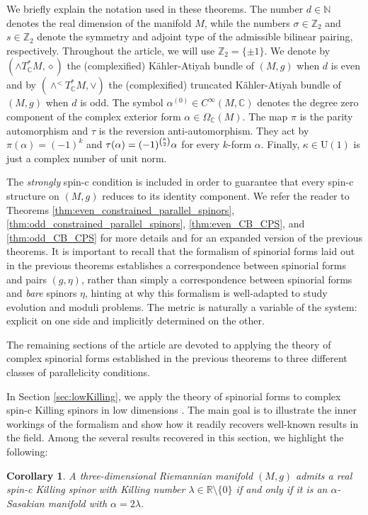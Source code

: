 \documentclass[10pt,a4paper,twoside,reqno]{amsart}
\theoremstyle{plain}
\newtheorem{cor}[thm]{Corollary}
\theoremstyle{definition}
\theoremstyle{remark}
\def\N{\mathbb{N}}
\def\Z{\mathbb{Z}}
\def\C{\mathbb{C}}
\def\R{\mathbb{R}}
\def\U{\mathrm{U}}
\def\R{\mathbb{R}}
\begin{document}
We briefly explain the notation used in these theorems. The number $d\in\N$ denotes the real dimension of the manifold $M$, while the numbers $\sigma\in\Z_2$ and $s\in\Z_2$ denote the symmetry and adjoint type of the admissible bilinear pairing, respectively. Throughout the article, we will use $\Z_2=\{\pm1\}$. We denote by $(\wedge T^*_\C M,\diamond)$ the (complexified) Kähler-Atiyah bundle of $(M,g)$ when $d$ is even and by $(\wedge^<T^*_\C M,\vee)$ the (complexified) truncated Kähler-Atiyah bundle of $(M,g)$ when $d$ is odd. The symbol $\alpha^{(0)}\in C^{\infty}(M,\C)$ denotes the degree zero component of the complex exterior form $\alpha\in\Omega_\C(M)$. The map $\pi$ is the parity automorphism and $\tau$ is the reversion anti-automorphism. They act by $\pi(\alpha)=(-1)^k$ and $\tau(\alpha)=\smash{(-1)^{\binom{k}{2}}}\alpha$ for every $k$-form $\alpha$. Finally, $\kappa\in\U(1)$ is just a complex number of unit norm.\medskip

The \emph{strongly} spin-c condition is included in order to guarantee that every spin-c structure on $(M,g)$ reduces to its identity component. We refer the reader to Theorems \ref{thm:even_constrained_parallel_spinors}, \ref{thm:odd_constrained_parallel_spinors}, \ref{thm:even_CB_CPS}, and \ref{thm:odd_CB_CPS} for more details and for an expanded version of the previous theorems. It is important to recall that the formalism of spinorial forms laid out in the previous theorems establishes a correspondence between spinorial forms and pairs $(g,\eta)$, rather than simply a correspondence between spinorial forms and \emph{bare} spinors $\eta$, hinting at why this formalism is well-adapted to study evolution and moduli problems. The metric is naturally a variable of the system: explicit on one side and implicitly determined on the other.\medskip

The remaining sections of the article are devoted to applying the theory of complex spinorial forms established in the previous theorems to three different classes of parallelicity conditions.\medskip

In Section \ref{sec:lowKilling}, we apply the theory of spinorial forms to complex spin-c Killing spinors in low dimensions \cite{Moroianu1997}. The main goal is to illustrate the inner workings of the formalism and show how it readily recovers well-known results in the field. Among the several results recovered in this section, we highlight the following:

\begin{cor}
A three-dimensional Riemannian manifold $(M,g)$ admits a real spin-c Killing spinor with Killing number $\lambda\in\R\setminus\{0\}$ if and only if it is an $\alpha$-Sasakian manifold with $\alpha=2\lambda$.
\end{cor}
\end{document}
